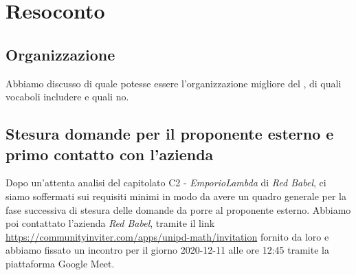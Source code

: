 \section{Resoconto}

\subsection{Organizzazione \Glossario}
Abbiamo discusso di quale potesse essere l'organizzazione migliore del \Glossario , di quali vocaboli includere e quali no.

\subsection{Stesura domande per il proponente esterno e primo contatto con l'azienda}
Dopo un'attenta analisi del capitolato C2 - \textit{EmporioLambda} di \textit{Red Babel}, ci siamo soffermati sui requisiti minimi in modo da avere un quadro generale per la fase successiva di stesura delle domande da porre al proponente esterno. Abbiamo poi contattato l'azienda \textit{Red Babel}, tramite il link \url{https://communityinviter.com/apps/unipd-math/invitation} fornito da loro e abbiamo fissato un incontro per il giorno 2020-12-11 alle ore 12:45 tramite la piattaforma Google Meet.
